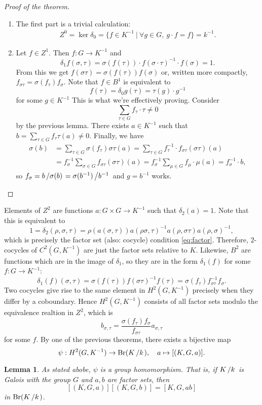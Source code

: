 \documentclass[10pt, a4paper]{article}
\newtheorem{lemma}[thm]{Lemma}
\newenvironment{noticeC}{%
  \tcolorbox[%
  notitle,
  empty,
  enhanced,  %
  breakable,
  coltext=black, 
  fontupper=\rmfamily,
  noparskip,
  sharp corners,
  boxrule=-1pt,  %
  frame hidden,
  left=7pt,  %
  right=7pt,
  top=5pt,
  bottom=5pt,
  before skip=2.5ex plus 2pt,
  after skip=2.5ex plus 2pt,
  overlay unbroken and last={%
  },
  ]}
{\endtcolorbox}
\newenvironment{myproof}%
  {\begin{noticeC}\begin{proof}}%
  {\end{proof}\end{noticeC}}
\newcommand{\quot}[2]{{\raisebox{0em}{$#1$}\left/\raisebox{0em}{$#2$}\right.}}
\DeclareMathOperator{\brauer}{Br}
\begin{document}
\begin{myproof}[Proof of the theorem]
  \begin{enumerate}
    \item The first part is a trivial calculation:
    \begin{align*}
      Z^0 = \ker \delta_0 = \{f \in K^{-1}\ |\ \forall g \in G,\ g \cdot f = f\} = k^{-1}.
    \end{align*}
    \item Let $f \in Z^1$. Then $f: G \to K^{-1}$ and 
    $$\delta_1 f(\sigma, \tau) = \sigma (f(\tau)) \cdot f(\sigma \cdot \tau)^{-1} \cdot f(\sigma) = 1.$$
    From this we get $f(\sigma \tau) = \sigma(f(\tau)) f(\sigma)$ or, written more compactly, $f_{\sigma \tau} = \sigma (f_\tau) f_\sigma$.
    Note that $f \in B^1$ is equivalent to 
    $$f(\tau) =\delta_0 g(\tau) = \tau (g) \cdot g^{-1}$$ 
    for some $g \in K^{-1}$ This is what we're effectively proving. Consider 
    $$\sum_{\tau \in G} f_\tau \cdot \tau \neq 0$$
    by the previous lemma. There exists $a \in K^{-1}$ such that $b = \sum_{\tau \in G} f_\tau \tau (a) \neq 0$.
    Finally, we have 
    \begin{align*}
      \sigma (b) &= \sum_{\tau \in G} \sigma (f_{\tau}) \sigma \tau (a) = \sum_{\tau \in G} f_\tau ^{-1} \cdot f_{\sigma \tau} (\sigma \tau) (a)\\
      &= f_{\sigma} ^{-1} \sum_{\sigma \in G} f_{\sigma \tau} (\sigma \tau) (a) = f_{\sigma} ^{-1} \sum_{\mu \in G} f_{\mu} \cdot \mu (a) = f_{\sigma} ^{-1} \cdot b,
    \end{align*}
    so $f_\sigma = \quot{b}{\sigma (b)} = \quot{\sigma (b^{-1})}{b^{-1}}$ and $g = b^{-1}$ works. \qedhere
  \end{enumerate}
\end{myproof}

Elements of $Z^2$ are functions $a: G \times G \to K^{-1}$ such that $\delta_2 (a) = 1$.
Note that this is equivalent to 
$$1 = \delta_2 (\rho, \sigma, \tau) = \rho (a (\sigma, \tau)) a(\rho \sigma, \tau)^{-1} a(\rho, \sigma \tau) a(\rho, \sigma)^{-1},$$
which is precisely the factor set (also: cocycle) condition \eqref{eq:factor}.
Therefore, $2$-cocycles of $C^2 (G, K^{-1})$ are just the factor sets relative to $K$.
Likewise, $B^2$ are functions which are in the image of $\delta_1$, so they are in the form $\delta_1 (f)$ for some $f: G \to K^{-1}$:
$$\delta_1 (f) (\sigma, \tau) = \sigma (f(\tau)) f (\sigma \tau)^{-1} f(\tau) = \sigma (f_{\tau}) f_{\sigma \tau}^{-1} f_{\sigma}.$$
Two cocycles give rise to the same element in $H^2 (G, K^{-1})$ precisely when they differ by a coboundary.
Hence $H^2 (G, K^{-1})$ consists of all factor sets modulo the equivalence realtion in $Z^2$, which is 
$$b_{\sigma, \tau} = \frac{\sigma (f_{\tau}) f_\sigma}{f_{\sigma \tau}} a_{\sigma, \tau}$$
for some $f$. By one of the previous theorems, there exists a bijective map 
$$\psi: H^2 (G, K^{-1}) \to \brauer (\quot{K}{k}),\quad a \mapsto [(K, G, a)].$$
\begin{lemma}
  As stated abobe, $\psi$ is a group homomorphism. That is, if $\quot{K}{k}$ is Galois with the group $G$ and $a, b$
  are factor sets, then $$[(K, G, a)] [(K, G, b)] = [K, G, ab]$$ in $\brauer (\quot{K}{k})$.
\end{lemma}
\end{document}
